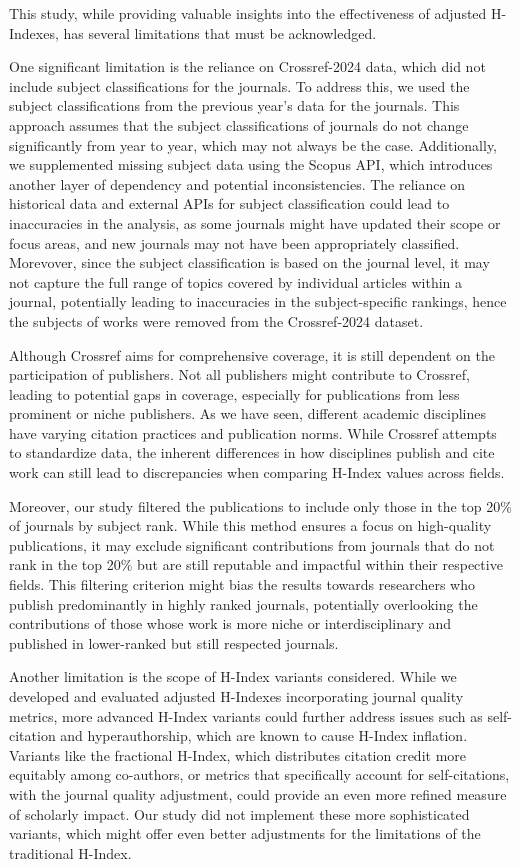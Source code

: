 This study, while providing valuable insights into the effectiveness of
adjusted H-Indexes, has several limitations that must be acknowledged.

One significant limitation is the reliance on Crossref-2024 data, which did not
include subject classifications for the journals. To address this, we used the
subject classifications from the previous year’s data for the journals. This
approach assumes that the subject classifications of journals do not change
significantly from year to year, which may not always be the case.
Additionally, we supplemented missing subject data using the Scopus API, which
introduces another layer of dependency and potential inconsistencies. The
reliance on historical data and external APIs for subject classification could
lead to inaccuracies in the analysis, as some journals might have updated their
scope or focus areas, and new journals may not have been appropriately
classified. Morevover, since the subject classification is based on the journal
level, it may not capture the full range of topics covered by individual
articles within a journal, potentially leading to inaccuracies in the
subject-specific rankings, hence the subjects of works were removed from the
Crossref-2024 dataset.

Although Crossref aims for comprehensive coverage, it is still dependent on the
participation of publishers. Not all publishers might contribute to Crossref,
leading to potential gaps in coverage, especially for publications from less
prominent or niche publishers. As we have seen, different academic disciplines
have varying citation practices and publication norms. While Crossref attempts
to standardize data, the inherent differences in how disciplines publish and
cite work can still lead to discrepancies when comparing H-Index values across
fields.

Moreover, our study filtered the publications to include only those in the top
20\% of journals by subject rank. While this method ensures a focus on
high-quality publications, it may exclude significant contributions from
journals that do not rank in the top 20\% but are still reputable and impactful
within their respective fields. This filtering criterion might bias the results
towards researchers who publish predominantly in highly ranked journals,
potentially overlooking the contributions of those whose work is more niche or
interdisciplinary and published in lower-ranked but still respected journals.

Another limitation is the scope of H-Index variants considered. While we
developed and evaluated adjusted H-Indexes incorporating journal quality
metrics, more advanced H-Index variants could further address issues such as
self-citation and hyperauthorship, which are known to cause H-Index inflation.
Variants like the fractional H-Index, which distributes citation credit more
equitably among co-authors, or metrics that specifically account for
self-citations, with the journal quality adjustment, could provide an even more
refined measure of scholarly impact. Our study did not implement these more
sophisticated variants, which might offer even better adjustments for the
limitations of the traditional H-Index.

